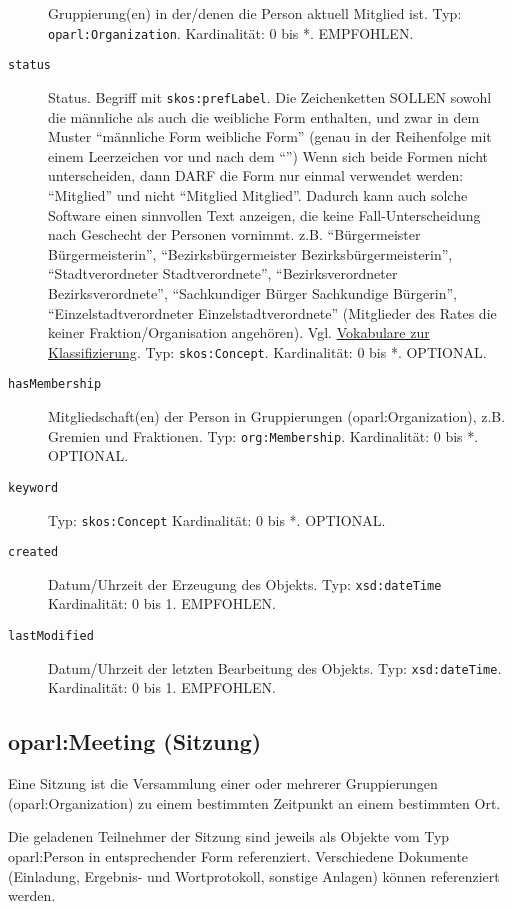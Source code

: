 \documentclass[,a4paper]{article}
\begin{document}
\begin{description}
Gruppierung(en) in der/denen die Person aktuell Mitglied ist. Typ:
\texttt{oparl:Organization}. Kardinalität: 0 bis *. EMPFOHLEN.
\item[\texttt{status}]
Status. Begriff mit \texttt{skos:prefLabel}. Die Zeichenketten SOLLEN
sowohl die männliche als auch die weibliche Form enthalten, und zwar in
dem Muster ``männliche Form \textbar{} weibliche Form'' (genau in der
Reihenfolge mit einem Leerzeichen vor und nach dem ``\textbar{}'') Wenn
sich beide Formen nicht unterscheiden, dann DARF die Form nur einmal
verwendet werden: ``Mitglied'' und nicht ``Mitglied \textbar{}
Mitglied''. Dadurch kann auch solche Software einen sinnvollen Text
anzeigen, die keine Fall-Unterscheidung nach Geschecht der Personen
vornimmt. z.B. ``Bürgermeister \textbar{} Bürgermeisterin'',
``Bezirksbürgermeister \textbar{} Bezirksbürgermeisterin'',
``Stadtverordneter \textbar{} Stadtverordnete'', ``Bezirksverordneter
\textbar{} Bezirksverordnete'', ``Sachkundiger Bürger \textbar{}
Sachkundige Bürgerin'', ``Einzelstadtverordneter \textbar{}
Einzelstadtverordnete'' (Mitglieder des Rates die keiner
Fraktion/Organisation angehören). Vgl.
\hyperref[vokabulareux5fklassifizierung]{Vokabulare zur
Klassifizierung}. Typ: \texttt{skos:Concept}. Kardinalität: 0 bis *.
OPTIONAL.
\item[\texttt{hasMembership}]
Mitgliedschaft(en) der Person in Gruppierungen (oparl:Organization),
z.B. Gremien und Fraktionen. Typ: \texttt{org:Membership}. Kardinalität:
0 bis *. OPTIONAL.
\item[\texttt{keyword}]
Typ: \texttt{skos:Concept} Kardinalität: 0 bis *. OPTIONAL.
\item[\texttt{created}]
Datum/Uhrzeit der Erzeugung des Objekts. Typ: \texttt{xsd:dateTime}
Kardinalität: 0 bis 1. EMPFOHLEN.
\item[\texttt{lastModified}]
Datum/Uhrzeit der letzten Bearbeitung des Objekts. Typ:
\texttt{xsd:dateTime}. Kardinalität: 0 bis 1. EMPFOHLEN.
\end{description}

\subsection{oparl:Meeting (Sitzung)}\label{oparlux5fmeeting}

Eine Sitzung ist die Versammlung einer oder mehrerer Gruppierungen
(oparl:Organization) zu einem bestimmten Zeitpunkt an einem bestimmten
Ort.

Die geladenen Teilnehmer der Sitzung sind jeweils als Objekte vom Typ
oparl:Person in entsprechender Form referenziert. Verschiedene Dokumente
(Einladung, Ergebnis- und Wortprotokoll, sonstige Anlagen) können
referenziert werden.
\end{document}
